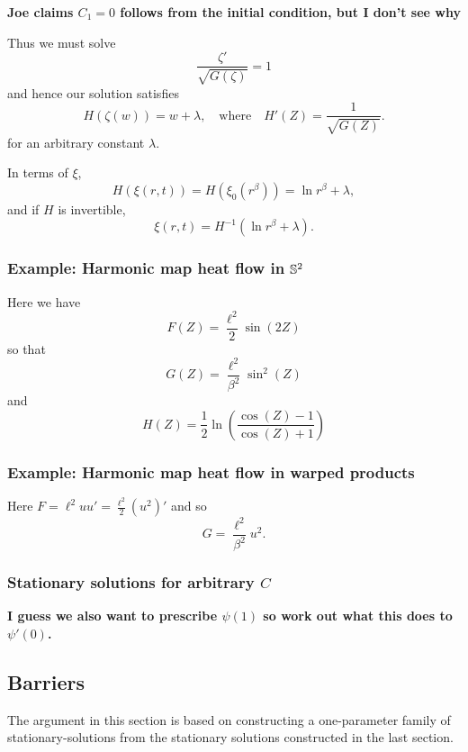\documentclass{amsart}
\begin{document}
\textbf{Joe claims \(C_1 = 0\) follows from the initial condition, but I don't see why}

Thus we must solve
\[
\frac{\zeta'}{\sqrt{G(\zeta)}} = 1
\]
and hence our solution satisfies
\[
H (\zeta(w)) = w + \lambda, \quad \text{where} \quad H'(Z) = \frac{1}{\sqrt{G(Z)}}.
\]
for an arbitrary constant \(\lambda\).

In terms of \(\xi\),
\[
H (\xi(r, t)) = H (\xi_0(r^{\beta})) = \ln r^{\beta} + \lambda,
\]
and if \(H\) is invertible,
\[
\xi(r, t) = H^{-1} (\ln r^{\beta} + \lambda).
\]

\subsubsection*{Example: Harmonic map heat flow in \(\S^2\)}

Here we have
\[
F(Z) = \frac{\ell^2}{2} \sin(2Z)
\]
so that
\[
G(Z) = \frac{\ell^2}{\beta^2} \sin^2(Z)
\]
and
\[
H(Z) = \frac{1}{2} \ln \left(\frac{\cos(Z) - 1}{\cos(Z) + 1}\right)
\]

\subsubsection*{Example: Harmonic map heat flow in warped products}

Here \(F = \ell^2 uu' = \tfrac{\ell^2}{2} (u^2)'\) and so
\[
G = \frac{\ell^2}{\beta^2} u^2.
\]
\subsubsection*{Stationary solutions for arbitrary \(C\)}


\textbf{I guess we also want to prescribe \(\psi(1)\) so work out what this does to \(\psi'(0)\).}
\subsection{Barriers}

The argument in this section is based on constructing a one-parameter family of stationary-solutions from the stationary solutions constructed in the last section.
\end{document}
